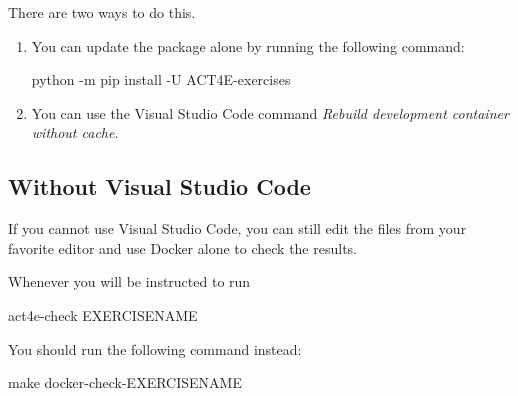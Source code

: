 There are two ways to do this.
\begin{enumerate}
    \item You can update the package alone by running the following command:

          \begin{console}
        python -m pip install -U ACT4E-exercises
    \end{console}
    \item You can use the Visual Studio Code command \emph{Rebuild development container without cache}.
\end{enumerate}

%
%
%
%
%
%
%
%
%

\subsection{Without Visual Studio Code}

If you cannot use Visual Studio Code, you can still edit the files from your favorite editor and use Docker alone
to check the results.

Whenever you will be instructed to run
\begin{console}
    act4e-check EXERCISENAME
\end{console}
You should run the following command instead:
\begin{console}
    make docker-check-EXERCISENAME
\end{console}

